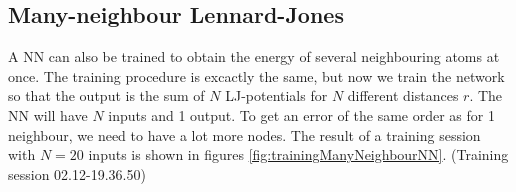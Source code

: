 \documentclass[twoside,english]{uiofysmaster}
\begin{document}
\subsection{Many-neighbour Lennard-Jones}
A NN can also be trained to obtain the energy of several neighbouring atoms at once. 
The training procedure is excactly the same, but now we train the network so that the output
is the sum of $N$ LJ-potentials for $N$ different distances $r$. The NN will have $N$ inputs and 1 output. 
To get an error of the same order as for 1 neighbour, we need to have a lot more nodes. The result of a training
session with $N=20$ inputs is shown in figures \autoref{fig:trainingManyNeighbourNN}. 
(Training session 02.12-19.36.50)

\end{document}
